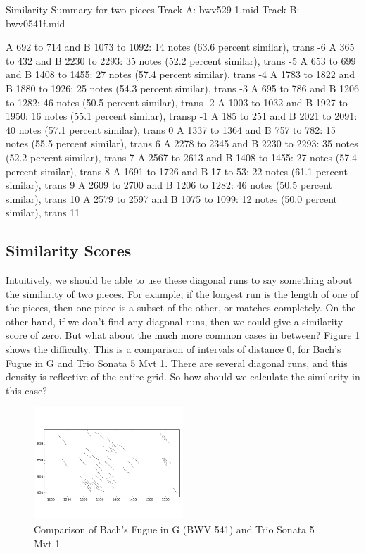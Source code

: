 \documentclass{article}
\begin{document}
\begin{sexylisting}{Similarity Summary for two pieces}
Track A: bwv529-1.mid
Track B: bwv0541f.mid

A 692 to 714 and B 1073 to 1092: 14 notes (63.6 percent similar), trans -6
A 365 to 432 and B 2230 to 2293: 35 notes (52.2 percent similar), trans -5
A 653 to 699 and B 1408 to 1455: 27 notes (57.4 percent similar), trans -4
A 1783 to 1822 and B 1880 to 1926: 25 notes (54.3 percent similar), trans -3
A 695 to 786 and B 1206 to 1282: 46 notes (50.5 percent similar), trans -2
A 1003 to 1032 and B 1927 to 1950: 16 notes (55.1 percent similar), transp -1
A 185 to 251 and B 2021 to 2091: 40 notes (57.1 percent similar), trans 0
A 1337 to 1364 and B 757 to 782: 15 notes (55.5 percent similar), trans 6
A 2278 to 2345 and B 2230 to 2293: 35 notes (52.2 percent similar), trans 7
A 2567 to 2613 and B 1408 to 1455: 27 notes (57.4 percent similar), trans 8
A 1691 to 1726 and B 17 to 53: 22 notes (61.1 percent similar), trans 9
A 2609 to 2700 and B 1206 to 1282: 46 notes (50.5 percent similar), trans 10
A 2579 to 2597 and B 1075 to 1099: 12 notes (50.0 percent similar), trans 11
\end{sexylisting}

\subsection{Similarity Scores}
Intuitively, we should be able to use these diagonal runs to say something about the similarity of two pieces. For example, if the longest run is the length of one of the pieces, then one piece is a subset of the other, or matches completely. On the other hand, if we don't find any diagonal runs, then we could give a similarity score of zero. But what about the much more common cases in between? Figure \ref{fig:random-filtering} shows the difficulty. This is a comparison of intervals of distance 0, for Bach's Fugue in G and Trio Sonata 5 Mvt 1. There are several diagonal runs, and this density is reflective of the entire grid. So how should we calculate the similarity in this case?

\begin{figure}[h]
\begin{center}\includegraphics[width=0.5\textwidth]{random.png}
\end{center}\caption{Comparison of Bach's Fugue in G (BWV 541) and Trio Sonata 5 Mvt 1} \label{fig:random-filtering}
\end{figure}
\end{document}
